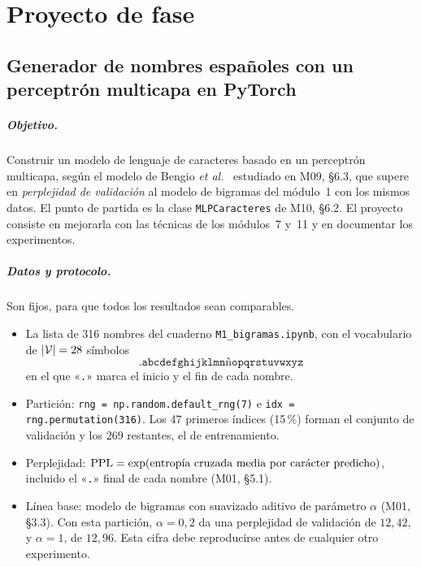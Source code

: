 \chapter*{Proyecto de fase}
\label{cap:proyecto}

\section*{Generador de nombres españoles con un perceptrón multicapa en PyTorch}

\paragraph{Objetivo.} Construir un modelo de lenguaje de caracteres basado en un perceptrón multicapa, según el modelo de Bengio \emph{et al.}~\cite{bengio} estudiado en M09, §6.3, que supere en \emph{perplejidad de validación} al modelo de bigramas del módulo~1 con los mismos datos. El punto de partida es la clase \texttt{MLPCaracteres} de M10, §6.2. El proyecto consiste en mejorarla con las técnicas de los módulos~7 y~11 y en documentar los experimentos.

\paragraph{Datos y protocolo.} Son fijos, para que todos los resultados sean comparables.
\begin{itemize}[leftmargin=1.4em]
  \item La lista de 316 nombres del cuaderno \texttt{M1\_bigramas.ipynb}, con el vocabulario de $\lvert\mathcal{V}\rvert=28$ símbolos
\[\texttt{.abcdefghijklmnñopqrstuvwxyz}\]
en el que «\texttt{.}» marca el inicio y el fin de cada nombre.
  \item Partición: \texttt{rng = np.random.default\_rng(7)} e \texttt{idx = rng.permutation(316)}. Los 47 primeros índices (15\,\%) forman el conjunto de validación y los 269 restantes, el de entrenamiento.
  \item Perplejidad: $\operatorname{PPL}=\exp(\text{entropía cruzada media por carácter predicho})$, incluido el «\texttt{.}» final de cada nombre (M01, §5.1).
  \item Línea base: modelo de bigramas con suavizado aditivo de parámetro $\alpha$ (M01, §3.3). Con esta partición, $\alpha=0{,}2$ da una perplejidad de validación de $12{,}42$, y $\alpha=1$, de $12{,}96$. Esta cifra debe reproducirse antes de cualquier otro experimento.
\end{itemize}

